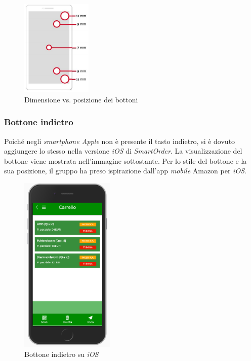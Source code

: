\documentclass[12pt, a4paper, titlepage]{report}
\begin{document}
	\begin{figure}[H] 
		\centering
		\includegraphics[width=0.3\textwidth]{img/dimvspos}
		\caption{Dimensione vs. posizione dei bottoni}
		\label{fig:dimvspos}
	\end{figure}

	\subsubsection{Bottone indietro}
	
	Poiché negli \textit{smartphone Apple} non è presente il tasto indietro, si è dovuto aggiungere lo stesso nella versione \textit{iOS} di \textit{SmartOrder}. La visualizzazione del bottone viene mostrata nell'immagine sottostante. Per lo stile del bottone e la sua posizione, il gruppo ha preso ispirazione dall'app \textit{mobile} Amazon per \textit{iOS}.
	
	\begin{figure}[H] 
		\centering
		\includegraphics[width=0.4\textwidth]{img/apple-cart}
		\caption{Bottone indietro su \textit{iOS}}
		\label{fig:bottIndietro}
	\end{figure} 
	
\end{document}
